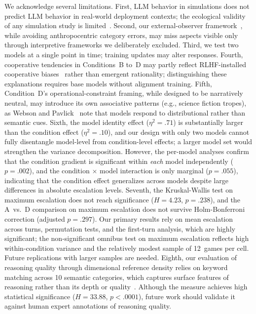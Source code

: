 \documentclass[manuscript, review=true, anonymous=true]{acmart}
\begin{document}
We acknowledge several limitations.
First, LLM behavior in simulations does not predict LLM behavior in real-world deployment contexts; the ecological validity of any simulation study is limited~\cite{liang2023helm,hendrycks2021mmlu}.
Second, our external-observer framework~\cite{morris1967naked,tinbergen1963aims}, while avoiding anthropocentric category errors, may miss aspects visible only through interpretive frameworks we deliberately excluded.
Third, we test two models at a single point in time; training updates may alter responses.
Fourth, cooperative tendencies in Conditions~B to~D may partly reflect RLHF-installed cooperative biases~\cite{ouyang2022training,bai2022constitutional} rather than emergent rationality; distinguishing these explanations requires base models without alignment training.
Fifth, Condition~D's operational-constraint framing, while designed to be narratively neutral, may introduce its own associative patterns (e.g., science fiction tropes), as Webson and Pavlick~\cite{webson2022prompt} note that models respond to distributional rather than semantic cues.
Sixth, the model identity effect ($\eta^2 = .71$) is substantially larger than the condition effect ($\eta^2 = .10$), and our design with only two models cannot fully disentangle model-level from condition-level effects; a larger model set would strengthen the variance decomposition.
However, the per-model analyses confirm that the condition gradient is significant within \emph{each} model independently ($p = .002$), and the condition $\times$ model interaction is only marginal ($p = .055$), indicating that the condition effect generalizes across models despite large differences in absolute escalation levels.
Seventh, the Kruskal-Wallis test on maximum escalation does not reach significance ($H = 4.23$, $p = .238$), and the A~vs.~D comparison on maximum escalation does not survive Holm-Bonferroni correction (adjusted $p = .297$).
Our primary results rely on mean escalation across turns, permutation tests, and the first-turn analysis, which are highly significant; the non-significant omnibus test on maximum escalation reflects high within-condition variance and the relatively modest sample of 12~games per cell.
Future replications with larger samples are needed.
Eighth, our evaluation of reasoning quality through dimensional reference density relies on keyword matching across 10 semantic categories, which captures surface features of reasoning rather than its depth or quality~\cite{scherrer2023moral}.
Although the measure achieves high statistical significance ($H = 33.88$, $p < .0001$), future work should validate it against human expert annotations of reasoning quality.
\end{document}
